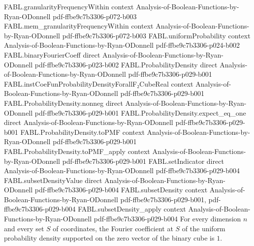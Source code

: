 \begin{theorem}
\proofstep
  {FABL.granularityFrequencyWithin}
  {context}
  {Analysis-of-Boolean-Functions-by-Ryan-ODonnell}
  {pdf-ffbe9c7b3306-p072-b003}
\proofstep
  {FABL.mem_granularityFrequencyWithin}
  {context}
  {Analysis-of-Boolean-Functions-by-Ryan-ODonnell}
  {pdf-ffbe9c7b3306-p072-b003}
\proofstep
  {FABL.uniformProbability}
  {context}
  {Analysis-of-Boolean-Functions-by-Ryan-ODonnell}
  {pdf-ffbe9c7b3306-p024-b002}
\proofstep
  {FABL.binaryFourierCoeff}
  {direct}
  {Analysis-of-Boolean-Functions-by-Ryan-ODonnell}
  {pdf-ffbe9c7b3306-p023-b002}
\proofstep
  {FABL.ProbabilityDensity}
  {direct}
  {Analysis-of-Boolean-Functions-by-Ryan-ODonnell}
  {pdf-ffbe9c7b3306-p029-b001}
\proofstep
  {FABL.instCoeFunProbabilityDensityForallF₂CubeReal}
  {context}
  {Analysis-of-Boolean-Functions-by-Ryan-ODonnell}
  {pdf-ffbe9c7b3306-p029-b001}
\proofstep
  {FABL.ProbabilityDensity.nonneg}
  {direct}
  {Analysis-of-Boolean-Functions-by-Ryan-ODonnell}
  {pdf-ffbe9c7b3306-p029-b001}
\proofstep
  {FABL.ProbabilityDensity.expect_eq_one}
  {direct}
  {Analysis-of-Boolean-Functions-by-Ryan-ODonnell}
  {pdf-ffbe9c7b3306-p029-b001}
\proofstep
  {FABL.ProbabilityDensity.toPMF}
  {context}
  {Analysis-of-Boolean-Functions-by-Ryan-ODonnell}
  {pdf-ffbe9c7b3306-p029-b001}
\proofstep
  {FABL.ProbabilityDensity.toPMF_apply}
  {context}
  {Analysis-of-Boolean-Functions-by-Ryan-ODonnell}
  {pdf-ffbe9c7b3306-p029-b001}
\proofstep
  {FABL.setIndicator}
  {direct}
  {Analysis-of-Boolean-Functions-by-Ryan-ODonnell}
  {pdf-ffbe9c7b3306-p029-b004}
\proofstep
  {FABL.subsetDensityValue}
  {direct}
  {Analysis-of-Boolean-Functions-by-Ryan-ODonnell}
  {pdf-ffbe9c7b3306-p029-b004}
\proofstep
  {FABL.subsetDensity}
  {context}
  {Analysis-of-Boolean-Functions-by-Ryan-ODonnell}
  {pdf-ffbe9c7b3306-p029-b001,
    pdf-ffbe9c7b3306-p029-b004}
\proofstep
  {FABL.subsetDensity_apply}
  {context}
  {Analysis-of-Boolean-Functions-by-Ryan-ODonnell}
  {pdf-ffbe9c7b3306-p029-b004}
For every dimension $n$ and every set $S$ of coordinates, the Fourier coefficient at $S$
of the uniform probability density supported on the zero vector of the binary cube is
$1$.
\end{theorem}


